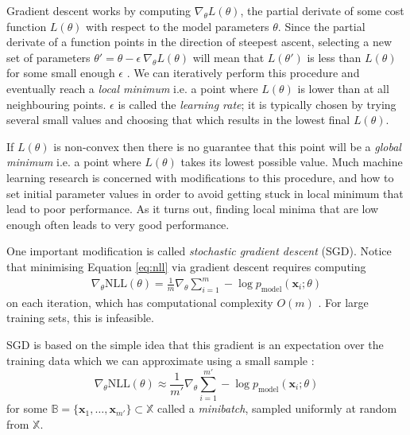 \documentclass[11pt, a4paper, bibliography=totoc]{report}
\newcommand{\x}{\mathbf{x}}
\begin{document}
Gradient descent works by computing $ \nabla_\theta L(\theta) $, the partial derivate of some cost function $ L(\theta) $ with respect to the model parameters $ \theta $. Since the partial derivate of a function points in the direction of steepest ascent, selecting a new set of parameters $ \theta' = \theta - \epsilon ~ \nabla_\theta L(\theta) $ will mean that $ L(\theta') $ is less than $ L(\theta) $ for some small enough $ \epsilon $ \cite[p.~83]{Goodfellow-et-al-2016}. We can iteratively perform this procedure and eventually reach a \textit{local minimum} i.e. a point where $ L(\theta) $ is lower than at all neighbouring points. $ \epsilon $ is called the \textit{learning rate}; it is typically chosen by trying several small values and choosing that which results in the lowest final $ L(\theta) $.

If $ L(\theta) $ is non-convex then there is no guarantee that this point will be a \textit{global minimum} i.e. a point where $ L(\theta) $ takes its lowest possible value. Much machine learning research is concerned with modifications to this procedure, and how to set initial parameter values in order to avoid getting stuck in local minimum that lead to poor performance. As it turns out, finding local minima that are low enough often leads to very good performance.

One important modification is called \textit{stochastic gradient descent} (SGD). Notice that minimising Equation \ref{eq:nll} via gradient descent requires computing
\begin{align*}
\nabla_\theta \text{NLL}(\theta) = \frac{1}{m} \nabla_\theta \sum_{i=1}^{m} - \log p_{\text{model}}(\x_i ; \theta)
\end{align*}
on each iteration, which has computational complexity $ O(m) $ \cite[p.~149]{Goodfellow-et-al-2016}. For large training sets, this is infeasible.

SGD is based on the simple idea that this gradient is an expectation over the training data which we can approximate using a small sample \cite[p.~149]{Goodfellow-et-al-2016}:
\begin{equation}
\nabla_\theta \text{NLL}(\theta) \approx \frac{1}{m'}  \nabla_\theta \sum_{i=1}^{m'} - \log p_{\text{model}}(\x_i ; \theta)
\end{equation}
for some $ \mathbb{B} = \{\x_1, \dots, \x_{m'} \} \subset \mathbb{X} $ called a \textit{minibatch}, sampled uniformly at random from $ \mathbb{X} $.
\end{document}
